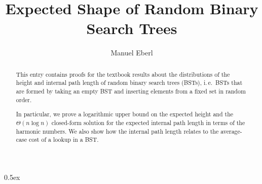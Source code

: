 \documentclass[11pt,a4paper]{article}
\begin{document}
\title{Expected Shape of Random Binary Search Trees}
\author{Manuel Eberl}
\maketitle

\begin{abstract}
This entry contains proofs for the textbook results about the distributions of the height and internal path length of random binary search trees (BSTs), i.\,e.\ BSTs that are formed by taking an empty BST and inserting elements from a fixed set in random order.

In particular, we prove a logarithmic upper bound on the expected height and the $\Theta(n \log n)$ closed-form solution for the expected internal path length in terms of the harmonic numbers. We also show how the internal path length relates to the average-case cost of a lookup in a BST.
\end{abstract}

\tableofcontents
\newpage
\parindent 0pt\parskip 0.5ex



\begingroup
\raggedright


\endgroup
\end{document}
